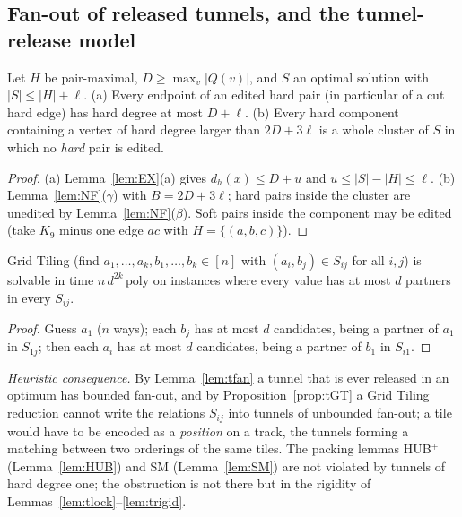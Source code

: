 \subsection{Fan-out of released tunnels, and the tunnel-release model}
\begin{lemma}\label{lem:tfan}
Let $H$ be pair-maximal, $D\ge\max_v|Q(v)|$, and $S$ an optimal solution with $|S|\le|H|+\ell$. (a) Every endpoint of an edited hard pair (in particular of a cut hard edge) has hard degree at most $D+\ell$. (b) Every hard component containing a vertex of hard degree larger than $2D+3\ell$ is a whole cluster of $S$ in which no \emph{hard} pair is edited.
\end{lemma}
\begin{proof}
(a) Lemma~\ref{lem:EX}(a) gives $d_h(x)\le D+u$ and $u\le|S|-|H|\le\ell$. (b) Lemma~\ref{lem:NF}($\gamma$) with $B=2D+3\ell$; hard pairs inside the cluster are unedited by Lemma~\ref{lem:NF}($\beta$). Soft pairs inside the component may be edited (take $K_9$ minus one edge $ac$ with $H=\{(a,b,c)\}$).
\end{proof}

\begin{proposition}\label{prop:tGT}
Grid Tiling (find $a_1,\dots,a_k,b_1,\dots,b_k\in[n]$ with $(a_i,b_j)\in S_{ij}$ for all $i,j$) is solvable in time $n\,d^{2k}\,\mathrm{poly}$ on instances where every value has at most $d$ partners in every $S_{ij}$.
\end{proposition}
\begin{proof}
Guess $a_1$ ($n$ ways); each $b_j$ has at most $d$ candidates, being a partner of $a_1$ in $S_{1j}$; then each $a_i$ has at most $d$ candidates, being a partner of $b_1$ in $S_{i1}$.
\end{proof}
\emph{Heuristic consequence.} By Lemma~\ref{lem:tfan} a tunnel that is ever released in an optimum has bounded fan-out, and by Proposition~\ref{prop:tGT} a Grid Tiling reduction cannot write the relations $S_{ij}$ into tunnels of unbounded fan-out; a tile would have to be encoded as a \emph{position} on a track, the tunnels forming a matching between two orderings of the same tiles. The packing lemmas HUB$^+$ (Lemma~\ref{lem:HUB}) and SM (Lemma~\ref{lem:SM}) are not violated by tunnels of hard degree one; the obstruction is not there but in the rigidity of Lemmas~\ref{lem:tlock}--\ref{lem:trigid}.

